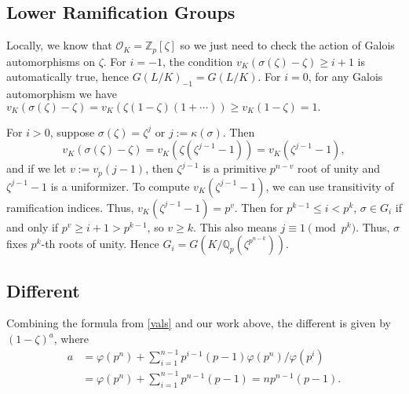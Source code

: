 \documentclass[12pt]{amsart}
\theoremstyle{named}
\newcommand{\Z}{\mathbb{Z}}
\newcommand{\Q}{\mathbb{Q}}
\newcommand{\Qp}{\Q_p}
\begin{document}
\subsection{Lower Ramification Groups} Locally, we know that $\mathcal{O}_K = \Z_p [\zeta]$ so we
just need to check the action of Galois automorphisms on $\zeta$. For $i = -1$, the condition
$v_K(\sigma(\zeta) - \zeta) \geq i + 1$ is automatically true, hence $G(L/K)_{-1} = G(L/K)$. For $i
= 0$, for any Galois automorphism we have $v_K(\sigma(\zeta) - \zeta) = v_K(\zeta(1 - \zeta)(1 +
\cdots)) \geq v_K(1-\zeta) = 1.$

For $i > 0$, suppose $\sigma(\zeta) = \zeta^j$ or $j := \kappa(\sigma)$. Then \[v_K(\sigma(\zeta) -
\zeta) = v_K(\zeta(\zeta^{j - 1} - 1)) = v_K(\zeta^{j - 1} - 1),\] and if we let $v := v_p(j - 1)$,
then $\zeta^{j - 1}$ is a primitive $p^{n - v}$ root of unity and $\zeta^{j - 1} - 1$ is a
uniformizer. To compute $v_K(\zeta^{j - 1} - 1)$, we can use transitivity of ramification indices.
Thus, $v_K(\zeta^{j - 1} - 1) = p^v$.
Then for $p^{k - 1} \leq i < p^k$, $\sigma \in G_i$ if and only if
$p^v \geq i + 1 > p^{k - 1}$, so $v \geq k$. This also means $j \equiv 1 \pmod{p^k}$. Thus, $\sigma$
fixes $p^k$-th roots of unity. Hence $G_i = G(K/\Qp(\zeta^{p^{n - k}})).$

\subsection{Different} Combining the formula from \ref{vals} and our work above, the different is
given by $(1 - \zeta)^a$, where
\begin{align*}
a & = \varphi(p^n) + \sum_{i = 1}^{n - 1} p^{i - 1}(p - 1) \varphi(p^n)/\varphi(p^i) \\
& = \varphi(p^n) + \sum_{i = 1}^{n - 1} p^{n - 1}(p - 1) = n p^{n - 1} (p - 1).
\end{align*}
\end{document}
